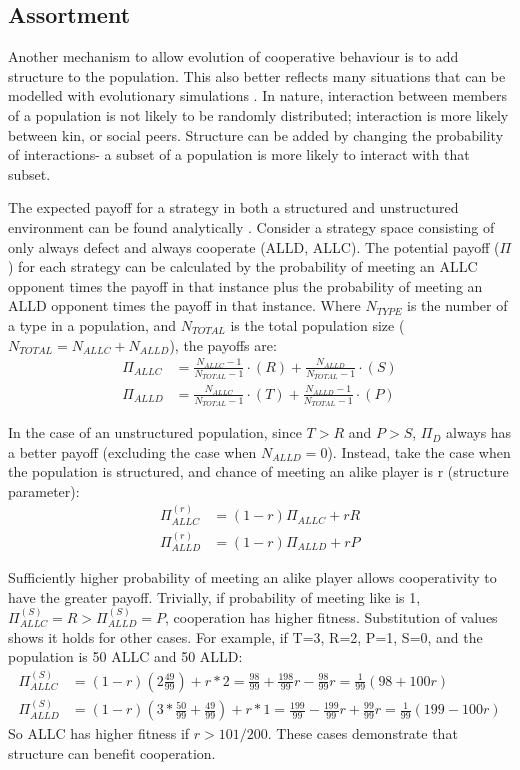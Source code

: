 \documentclass[a4paper,11pt,bcshonoursthesis,singlespace,oneside,thesisdraft,pdflatex]{cssethesis}
\begin{document}
\subsection{Assortment}
Another mechanism to allow evolution of cooperative behaviour is to add structure to the population. 
This also better reflects many situations that can be modelled with evolutionary simulations \citep{eshel:PNAS:1982}. 
In nature, interaction between members of a population is not likely to be randomly distributed; interaction is more likely between kin, or social peers. 
Structure can be added by changing the probability of interactions- a subset of a population is more likely to interact with that subset. 

The expected payoff for a strategy in both a structured and unstructured environment can be found analytically \citep{van-veelen:PNAS:2012}. 
Consider a strategy space consisting of only always defect and always cooperate (ALLD, ALLC). 
The potential payoff ($\Pi$) for each strategy can be calculated by the probability of meeting an ALLC opponent times the payoff in that instance plus the probability of meeting an ALLD opponent times the payoff in that instance. Where $N_{TYPE}$ is the number of a type in a population, and $N_{TOTAL}$ is the total population size ($N_{TOTAL}=N_{ALLC}+ N_{ALLD}$), the payoffs are:
\begin{align*}
\Pi_{ALLC}&=\frac{N_{ALLC}-1}{N_{TOTAL}-1} \cdot (R) + \frac{N_{ALLD}}{N_{TOTAL}-1}\cdot ({S})\\
\Pi_{ALLD}&=\frac{N_{ALLC}}{N_{TOTAL}-1} \cdot (T) + \frac{N_{ALLD}-1}{N_{TOTAL}-1}\cdot ({P})
\end{align*}

In the case of an unstructured population, since $T>R$ and $P>S$, $\Pi_D$ always has a better payoff (excluding the case when $N_{ALLD}=0$). 
Instead, take the case when the population is structured, and chance of meeting an alike player is r (structure parameter):
\begin{align*}
\Pi^{(r)}_{ALLC}&=(1-r)\Pi_{ALLC}+ rR\\
\Pi^{(r)}_{ALLD}&=(1-r)\Pi_{ALLD}+ rP
\end{align*}

Sufficiently higher probability of meeting an alike player allows cooperativity to have the greater payoff. 
Trivially, if probability of meeting like is 1, $\Pi^{(S)}_{ALLC}=R>\Pi^{(S)}_{ALLD}=P$, cooperation has higher fitness.  
Substitution of values shows it holds for other cases. 
For example, if T=3, R=2, P=1, S=0, and the population is 50 ALLC and 50 ALLD:
\begin{align*}
\Pi^{(S)}_{ALLC}&=(1-r)(2\frac{49}{99})+r*2=\frac{98}{99}+\frac{198}{99}r-\frac{98}{99}r=\frac{1}{99}(98+100r)\\
\Pi^{(S)}_{ALLD}&=(1-r)(3*\frac{50}{99} + \frac{49}{99})+ r*1=\frac{199}{99}-\frac{199}{99}r+\frac{99}{99}r=\frac{1}{99}(199-100r)
\end{align*}
So ALLC has higher fitness if $r>101/200$. These cases demonstrate that structure can benefit cooperation. 
\end{document}
